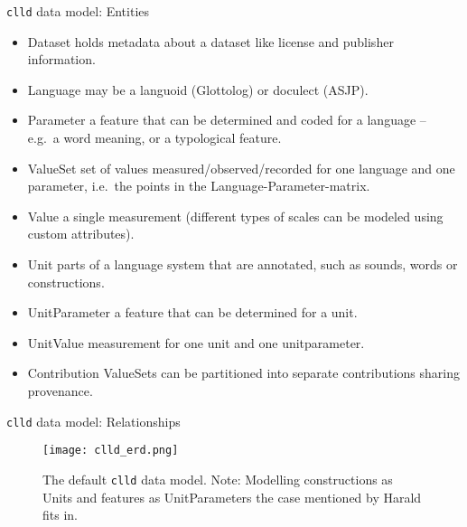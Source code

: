 \documentclass{beamer}
\begin{document}
\begin{frame}{\texttt{clld} data model: Entities}
\begin{itemize}
\item {\color{darkred}Dataset} {\scriptsize holds metadata about a dataset like license and publisher information.}
\item {\color{darkred}Language} {\scriptsize may be a languoid (Glottolog) or doculect (ASJP).}
\item {\color{darkred}Parameter} {\scriptsize a feature that can be determined and coded for a language – e.g.~a
word meaning, or a typological feature.}
\item {\color{darkred}ValueSet} {\scriptsize set of values
measured/observed/recorded for one language and one parameter,
i.e.~the points in the Language-Parameter-matrix.}
\item {\color{darkred}Value} {\scriptsize a single measurement (different types of scales
can be modeled using custom attributes).
}
\item {\color{darkred}Unit} {\scriptsize parts of a language system that are annotated, such as sounds, words or constructions.}
\item {\color{darkred}UnitParameter} {\scriptsize a feature that can be determined for a unit.}
\item {\color{darkred}UnitValue} {\scriptsize measurement for one unit and one unitparameter.}
\item {\color{darkred}Contribution} {\scriptsize ValueSets can be partitioned into separate contributions sharing provenance.}
\end{itemize}
\end{frame}



\begin{frame}{\texttt{clld} data model: Relationships}
\begin{figure}
\texttt{[image: clld\_erd.png]}
\caption{\label{fig:clld}The default \texttt{clld} data model.
Note: Modelling constructions as Units and features as UnitParameters the case
mentioned by Harald fits in.}
\end{figure}
\end{frame}
\end{document}
